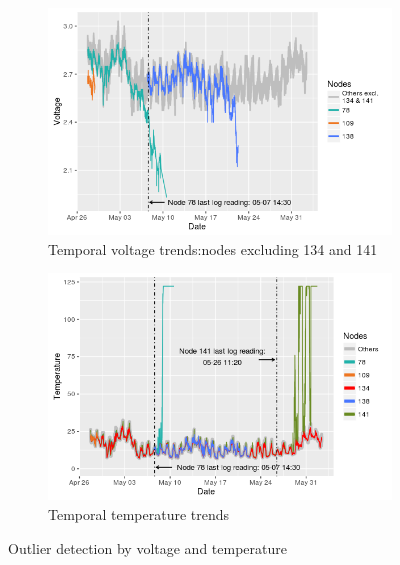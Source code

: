 \documentclass[11pt]{article}
\begin{document}
\begin{figure}[here]
  \begin{subfigure}{.5\textwidth}
    \centering
      \includegraphics[width=0.9\linewidth]{../figures/voltDate_1.png}
    \caption{Temporal voltage trends:nodes excluding 134 and 141}
    \label{fig:voltDate1}
  \end{subfigure}%
  \begin{subfigure}{.5\textwidth}
    \centering
      \includegraphics[width=0.9\linewidth]{../figures/tempDate.png}
    \caption{Temporal temperature trends}
    \label{fig:tempDate}
  \end{subfigure}
\caption{Outlier detection by voltage and temperature}
\label{fig:tempVoltOutliers}
\end{figure}%
\end{document}
